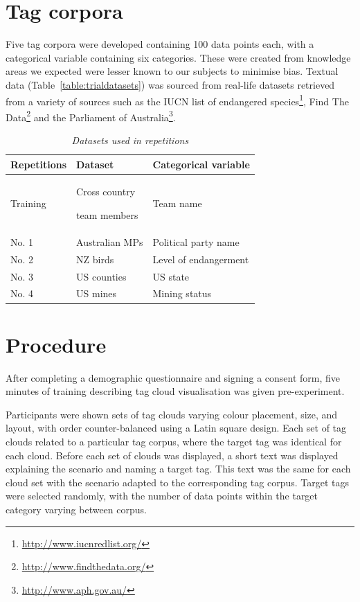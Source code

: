 \section{Tag corpora}\label{sect:tagcorpora}
Five tag corpora were developed containing 100 data points each, with a categorical variable containing six categories. These were created from knowledge areas we expected were lesser known to our subjects to minimise bias. Textual data (Table~\vref{table:trialdatasets}) was sourced from real-life datasets retrieved from a variety of sources such as the IUCN list of endangered species\footnote{\url{http://www.iucnredlist.org/}}, Find The Data\footnote{\url{http://www.findthedata.org/}} and the Parliament of Australia\footnote{\url{http://www.aph.gov.au/}}.

\begin{table}
\centering
\caption{\textit{Datasets used in repetitions}}
\begin{tabular}{|p{3cm}|p{3cm}|p{5cm}|} \hline
\textbf{Repetitions}&\textbf{Dataset}&\textbf{Categorical variable}\\ \hline
Training & Cross country\par team members & Team name\\ \hline
No. 1 & Australian MPs & Political party name\\ \hline
No. 2 & NZ birds & Level of endangerment\\ \hline
No. 3 & US counties & US state\\ \hline
No. 4 & US mines & Mining status\\
\hline\end{tabular}
\label{table:trialdatasets}
\end{table}

\section{Procedure}

After completing a demographic questionnaire and signing a consent form, five minutes of training describing tag cloud visualisation was given pre-experiment. 

Participants were shown sets of tag clouds varying colour placement, size, and layout, with order counter-balanced using a Latin square design. Each set of tag clouds related to a particular tag corpus, where the target tag was identical for each cloud. Before each set of clouds was displayed, a short text was displayed explaining the scenario and naming a target tag. This text was the same for each cloud set with the scenario adapted to the corresponding tag corpus.  Target tags were selected randomly, with the number of data points within the target category varying between corpus. 

